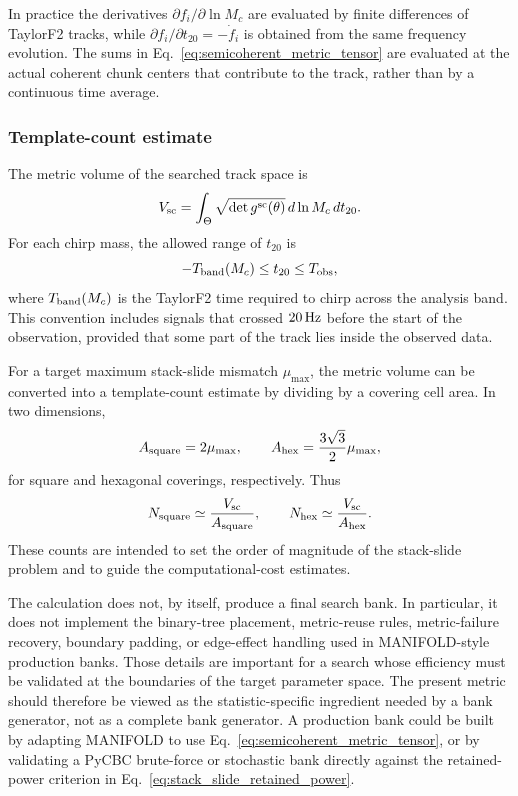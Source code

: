 In practice the derivatives $\partial f_i/\partial\ln M_c$ are evaluated by
finite differences of TaylorF2 tracks, while
$\partial f_i/\partial t_{20}=-\dot f_i$ is obtained from the same frequency
evolution.  The sums in Eq.~\eqref{eq:semicoherent_metric_tensor} are evaluated
at the actual coherent chunk centers that contribute to the track, rather than
by a continuous time average.

\subsubsection{Template-count estimate}
\label{sec:semicoherent_count_estimate}

The metric volume of the searched track space is
\begin{equation}
    V_{\rm sc}
    =
    \int_\Theta
    \sqrt{\det g^{\rm sc}(\theta)}
    \,d\ln M_c\,dt_{20}.
    \label{eq:semicoherent_metric_volume}
\end{equation}
For each chirp mass, the allowed range of $t_{20}$ is
\begin{equation}
    -T_{\rm band}(M_c) \leq t_{20} \leq T_{\rm obs},
    \label{eq:t20_range}
\end{equation}
where $T_{\rm band}(M_c)$ is the TaylorF2 time required to chirp across the
analysis band.  This convention includes signals that crossed $20\,{\rm Hz}$
before the start of the observation, provided that some part of the track lies
inside the observed data.

For a target maximum stack-slide mismatch $\mu_{\max}$, the metric volume can
be converted into a template-count estimate by dividing by a covering cell
area.  In two dimensions,
\begin{equation}
    A_{\rm square} = 2\mu_{\max},
    \qquad
    A_{\rm hex} = \frac{3\sqrt{3}}{2}\mu_{\max},
\end{equation}
for square and hexagonal coverings, respectively.  Thus
\begin{equation}
    N_{\rm square}\simeq\frac{V_{\rm sc}}{A_{\rm square}},
    \qquad
    N_{\rm hex}\simeq\frac{V_{\rm sc}}{A_{\rm hex}}.
    \label{eq:semicoherent_template_counts}
\end{equation}
These counts are intended to set the order of magnitude of the stack-slide
problem and to guide the computational-cost estimates.

The calculation does not, by itself, produce a final search bank.  In
particular, it does not implement the binary-tree placement, metric-reuse
rules, metric-failure recovery, boundary padding, or edge-effect handling used
in MANIFOLD-style production banks.  Those details are important for a search
whose efficiency must be validated at the boundaries of the target parameter
space.  The present metric should therefore be viewed as the statistic-specific
ingredient needed by a bank generator, not as a complete bank generator.  A
production bank could be built by adapting MANIFOLD to use
Eq.~\eqref{eq:semicoherent_metric_tensor}, or by validating a PyCBC brute-force
or stochastic bank directly against the retained-power criterion in
Eq.~\eqref{eq:stack_slide_retained_power}.
